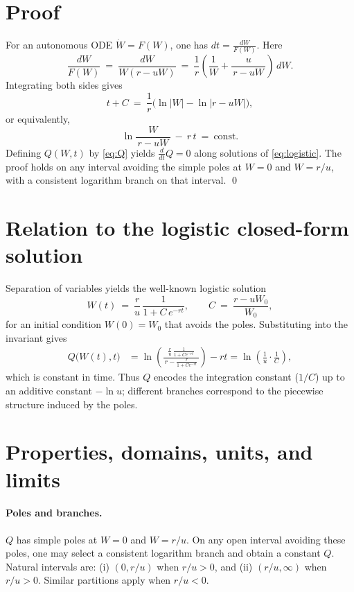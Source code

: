 \documentclass[11pt]{article}
\begin{document}
\section{Proof}
For an autonomous ODE $\dot W=F(W)$, one has $dt = \tfrac{dW}{F(W)}$. Here
\begin{equation}
\frac{dW}{F(W)} \ =\ \frac{dW}{W(r-uW)}
\ =\ \frac{1}{r}\left(\frac{1}{W}+\frac{u}{\,r-uW\,}\right)\,dW.
\end{equation}
Integrating both sides gives
\begin{equation}
t + C \ =\ \frac{1}{r}\Big(\ln|W|-\ln|r-uW|\Big),
\end{equation}
or equivalently,
\begin{equation}
\ln\!\frac{W}{\,r-uW\,}\ -\ r\,t \ =\ \text{const}.
\end{equation}
Defining $Q(W,t)$ by \eqref{eq:Q} yields $\tfrac{d}{dt}Q=0$ along solutions of \eqref{eq:logistic}. The proof holds on any interval avoiding the simple poles at $W=0$ and $W=r/u$, with a consistent logarithm branch on that interval. \qed

\section{Relation to the logistic closed-form solution}
Separation of variables yields the well-known logistic solution
\begin{equation}
W(t)\ =\ \frac{r}{u}\,\frac{1}{1+C\,e^{-r t}},\qquad
C\ =\ \frac{r-uW_0}{W_0},
\end{equation}
for an initial condition $W(0)=W_0$ that avoids the poles. Substituting into the invariant gives
\begin{align}
Q\big(W(t),t\big)
&= \ln\!\left(\frac{\tfrac{r}{u}\,\tfrac{1}{1+C e^{-rt}}}{\,r-\tfrac{r}{1+C e^{-rt}}\,}\right) - rt
= \ln\!\left(\frac{1}{u}\cdot\frac{1}{C}\right),
\end{align}
which is constant in time. Thus $Q$ encodes the integration constant ($1/C$) up to an additive constant $-\ln u$; different branches correspond to the piecewise structure induced by the poles.

\section{Properties, domains, units, and limits}
\paragraph{Poles and branches.} $Q$ has simple poles at $W=0$ and $W=r/u$. On any open interval avoiding these poles, one may select a consistent logarithm branch and obtain a constant $Q$. Natural intervals are: (i) $(0,r/u)$ when $r/u>0$, and (ii) $(r/u,\infty)$ when $r/u>0$. Similar partitions apply when $r/u<0$.
\end{document}

